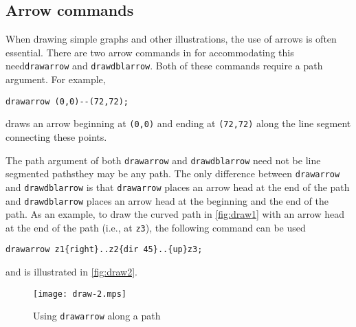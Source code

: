 \subsection{Arrow commands}

When drawing simple graphs and other illustrations, the use of arrows is
often essential.  There are two arrow commands in \MP{} for
accommodating this need\Dash \texttt{drawarrow} and
\texttt{drawdblarrow}.  Both of these commands require a path argument.
For example,

\begin{center}
  \verb|drawarrow (0,0)--(72,72);|
\end{center}
draws an arrow beginning at \verb|(0,0)| and ending at \verb|(72,72)|
along the line segment connecting these points.

The path argument of both \texttt{drawarrow} and \texttt{drawdblarrow}
need not be line segmented paths\Dash they may be any \MP{} path.  The
only difference between \texttt{drawarrow} and \texttt{drawdblarrow} is
that \texttt{drawarrow} places an arrow head at the end of the path and
\texttt{drawdblarrow} places an arrow head at the beginning and the end
of the path.  As an example, to draw the curved path in
\autoref{fig:draw1} with an arrow head at the end of the path (i.e., at
\texttt{z3}), the following command can be used

\begin{center}
  \verb|drawarrow z1{right}..z2{dir 45}..{up}z3;|
\end{center}
and is illustrated in \autoref{fig:draw2}.

\begin{figure}
  \centering
  \texttt{[image: draw-2.mps]}
  \caption{Using \texttt{drawarrow} along a path}
  \label{fig:draw2}
\end{figure}
